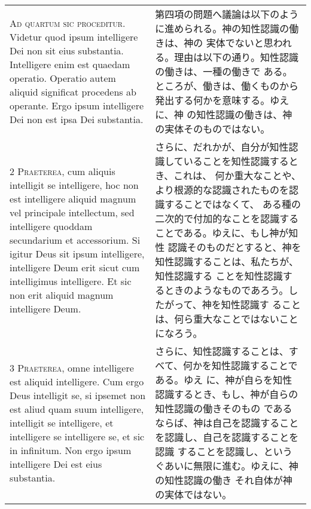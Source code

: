 \documentclass[10pt]{jsarticle} %
\begin{document}
\begin{longtable}{p{21em}p{21em}}

{\huge A}{\scshape d quartum sic proceditur}. Videtur quod ipsum
intelligere Dei non sit eius substantia. Intelligere enim est quaedam
operatio. Operatio autem aliquid significat procedens ab
operante. Ergo ipsum intelligere Dei non est ipsa Dei substantia.

&

第四項の問題へ議論は以下のように進められる。神の知性認識の働きは、神の
実体でないと思われる。理由は以下の通り。知性認識の働きは、一種の働きで
ある。ところが、働きは、働くものから発出する何かを意味する。ゆえに、神
の知性認識の働きは、神の実体そのものではない。


\\


{\scshape 2 Praeterea}, cum aliquis intelligit se intelligere, hoc non
est intelligere aliquid magnum vel principale intellectum, sed
intelligere quoddam secundarium et accessorium. Si igitur Deus sit
ipsum intelligere, intelligere Deum erit sicut cum intelligimus
intelligere. Et sic non erit aliquid magnum intelligere Deum.

&

さらに、だれかが、自分が知性認識していることを知性認識するとき、これは、
何か重大なことや、より根源的な認識されたものを認識することではなくて、
ある種の二次的で付加的なことを認識することである。ゆえに、もし神が知性
認識そのものだとすると、神を知性認識することは、私たちが、知性認識する
ことを知性認識するときのようなものであろう。したがって、神を知性認識す
ることは、何ら重大なことではないことになろう。


\\


{\scshape 3 Praeterea}, omne intelligere est aliquid intelligere. Cum
ergo Deus intelligit se, si ipsemet non est aliud quam suum
intelligere, intelligit se intelligere, et intelligere se intelligere
se, et sic in infinitum. Non ergo ipsum intelligere Dei est eius
substantia.

&

さらに、知性認識することは、すべて、何かを知性認識することである。ゆえ
に、神が自らを知性認識するとき、もし、神が自らの知性認識の働きそのもの
であるならば、神は自己を認識することを認識し、自己を認識することを認識
することを認識し、というぐあいに無限に進む。ゆえに、神の知性認識の働き
それ自体が神の実体ではない。


\end{longtable}
\end{document}
